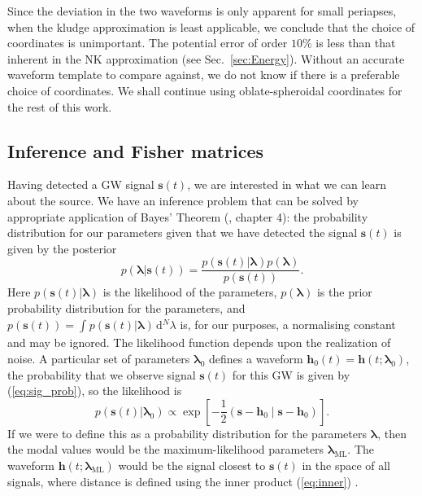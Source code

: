 \documentclass[useAMS,usedcolumn,usegraphicx,usenatbib]{mn2e}
\newcommand{\eqnref}[1]{(\ref{eq:#1})}
\newcommand{\secref}[1]{Sec.~\ref{sec:#1}}
\newcommand{\sub}[1]{\ensuremath{_\mathrm{#1}}}
\newcommand{\dd}{\ensuremath{\mathrm{d}}}
\newcommand{\intd}[4]{\ensuremath{\int_{#1}^{#2}{#3}\,\dd{#4}}}
\newcommand{\recip}[1]{\ensuremath{\frac{1}{#1}}}
\newcommand{\innerprod}[2]{\ensuremath{\left({#1}\middle|{#2}\right)}}
\begin{document}
Since the deviation in the two waveforms is only apparent for small periapses, when the kludge approximation is least applicable, we conclude that the choice of coordinates is unimportant. The potential error of order $10\%$ is less than that inherent in the NK approximation (see \secref{Energy}). Without an accurate waveform template to compare against, we do not know if there is a preferable choice of coordinates. We shall continue using oblate-spheroidal coordinates for the rest of this work.

\subsection{Inference and Fisher matrices}

Having detected a GW signal $\boldsymbol{s}(t)$, we are interested in what we can learn about the source. We have an inference problem that can be solved by appropriate application of Bayes' Theorem (\citealt{Jaynes2003}, chapter 4): the probability distribution for our parameters given that we have detected the signal $\boldsymbol{s}(t)$ is given by the posterior
\begin{equation}
p(\boldsymbol{\lambda}|\boldsymbol{s}(t)) = \frac{p(\boldsymbol{s}(t)|\boldsymbol{\lambda})p(\boldsymbol{\lambda})}{p(\boldsymbol{s}(t))}.
\end{equation}
Here $p(\boldsymbol{s}(t)|\boldsymbol{\lambda})$ is the likelihood of the parameters, $p(\boldsymbol{\lambda})$ is the prior probability distribution for the parameters, and $p(\boldsymbol{s}(t)) = \intd{}{}{p(\boldsymbol{s}(t)|\boldsymbol{\lambda})}{^N \lambda}$ is, for our purposes, a normalising constant and may be ignored. The likelihood function depends upon the realization of noise. A particular set of parameters $\boldsymbol{\lambda}_0$ defines a waveform $\boldsymbol{h}_0(t) = \boldsymbol{h}(t; \boldsymbol{\lambda}_0)$, the probability that we observe signal $\boldsymbol{s}(t)$ for this GW is given by \eqnref{sig_prob}, so the likelihood is
\begin{equation}
p(\boldsymbol{s}(t)|\boldsymbol{\lambda}_0) \propto \exp\left[-\recip{2}\innerprod{\boldsymbol{s}-\boldsymbol{h}_0}{\boldsymbol{s}-\boldsymbol{h}_0}\right].
\end{equation}
If we were to define this as a probability distribution for the parameters $\boldsymbol{\lambda}$, then the modal values would be the maximum-likelihood parameters $\boldsymbol{\lambda}\sub{ML}$. The waveform $\boldsymbol{h}(t; \boldsymbol{\lambda}\sub{ML})$ would be the signal closest to $\boldsymbol{s}(t)$ in the space of all signals, where distance is defined using the inner product \eqnref{inner} \citep{Cutler1994}.
\end{document}
